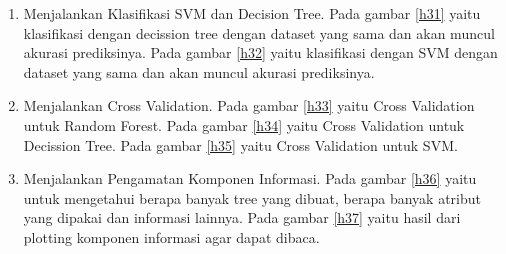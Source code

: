 \begin{enumerate}
\item Menjalankan Klasifikasi SVM dan Decision Tree.
\subitem Pada gambar \ref{h31} yaitu klasifikasi dengan decission tree dengan dataset yang sama dan akan muncul akurasi prediksinya.
\subitem Pada gambar \ref{h32} yaitu  klasifikasi dengan SVM dengan dataset yang sama dan akan muncul akurasi prediksinya.
\item Menjalankan Cross Validation.
\subitem Pada gambar \ref{h33} yaitu Cross Validation untuk  Random Forest.
\subitem Pada gambar \ref{h34} yaitu Cross Validation untuk Decission Tree.
\subitem Pada gambar \ref{h35} yaitu Cross Validation untuk SVM.
\item Menjalankan Pengamatan Komponen Informasi.
\subitem Pada gambar \ref{h36} yaitu untuk mengetahui berapa banyak tree yang dibuat, berapa banyak atribut yang dipakai dan informasi lainnya.
\subitem Pada gambar \ref{h37} yaitu hasil dari plotting komponen informasi agar dapat dibaca.
\end{enumerate}

